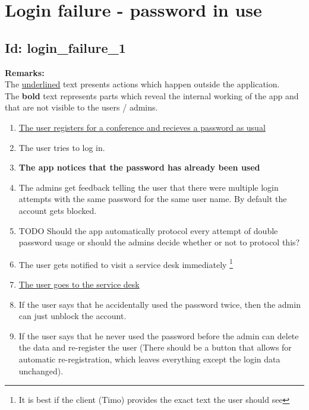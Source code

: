 \documentclass{article}
\begin{document}
\section*{Login failure - password in use}
\subsection*{Id: login\_failure\_1}
\noindent
\textbf{Remarks:}\\
 The \underline{underlined} text presents actions which happen outside the application. \\
 The \textbf{bold} text represents parts which reveal the internal working of the app and that are not visible to the users / admins.
\begin{enumerate}
	\item \underline{The user registers for a conference and recieves a password as usual}
	\item The user tries to log in.
	\item \textbf{The app notices that the password has already been used}
	\item The admins get feedback telling the user that there were multiple login attempts with the same password for the same user name. By default the account gets blocked.
	\item TODO Should the app automatically protocol every attempt of double password usage or should the admins decide whether or not to protocol this?
	\item The user gets notified to visit a service desk immediately \footnote{It is best if the client (Timo) provides the exact text the user should see }
	\item \underline{The user goes to the service desk}
	\item If the user says that he accidentally used the password twice, then the admin can just unblock the account.
	\item If the user says that he never used the password before the admin can delete the data and re-register the user (There should be a button that allows for automatic re-registration, which leaves everything except the login data unchanged).

\end{enumerate}
\end{document}
